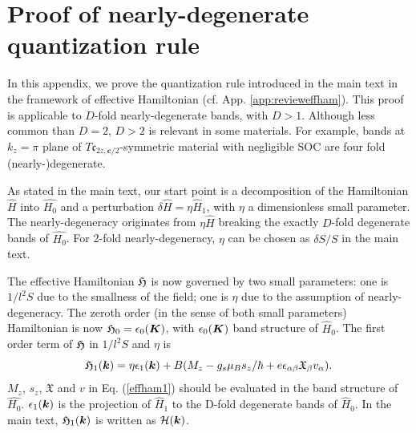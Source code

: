 \documentclass[aps, prb, showpacs, twocolumn, notitlepage, superscriptaddress]{revtex4-1}
\begin{document}
\section{Proof of nearly-degenerate quantization rule\label{app:quantizationruleproof}}

In this appendix, we prove the quantization rule introduced in the main text in the framework of effective Hamiltonian (cf. App. \ref{app:revieweffham}). This proof is applicable to $D$-fold nearly-degenerate bands, with $D>1$. Although less common than $D=2$, $D>2$ is relevant in some materials. For example, bands at $k_z=\pi$ plane of $T\mathfrak{c}_{2z,\boldsymbol{c}/2}$-symmetric material with negligible SOC are four fold (nearly-)degenerate.

As stated in the main text, our start point is a decomposition of the Hamiltonian $\hat{H}$ into $\hat{H_0}$ and a perturbation $\delta\hat{H}=\eta\hat{H}_1$, with $\eta$ a dimensionless small parameter. The nearly-degeneracy originates from $\eta\hat{H}$ breaking the exactly $D$-fold degenerate bands of $\hat{H_0}$. For 2-fold nearly-degeneracy, $\eta$ can be chosen as $\delta S/S$ in the main text.

The effective Hamiltonian $\mathfrak{H}$ is now governed by two small parameters: one is $1/l^2S$ due to the smallness of the field; one is $\eta$ due to the assumption of nearly-degeneracy. The zeroth order (in the sense of both small parameters) Hamiltonian is now $\mathfrak{H}_0=\epsilon_0(\boldsymbol{K})$, with $\epsilon_0(\boldsymbol{K})$ band structure of $\hat{H}_0$. The first order term of $\mathfrak{H}$ in $1/l^2S$ and $\eta$ is 
\begin{equation}
\mathfrak{H}_1(\boldsymbol{k}) = \eta\epsilon_1(\boldsymbol{k})+B(M_{z}-g_s\mu_{B}s_{z}/\hbar+e\epsilon_{\alpha\beta}\mathfrak{X}_{\beta}v_{\alpha}). \label{effham1}
\end{equation}
$M_z$, $s_z$, $\mathfrak{X}$ and $v$ in Eq. (\ref{effham1}) should be evaluated in the band structure of $\hat{H_0}$. $\epsilon_1(\boldsymbol{k})$ is the projection of $\hat{H}_1$ to the D-fold degenerate bands of $\hat{H}_0$. In the main text, $\mathfrak{H}_1(\boldsymbol{k})$ is written as $\mathcal{H}(\boldsymbol{k})$.
\end{document}
